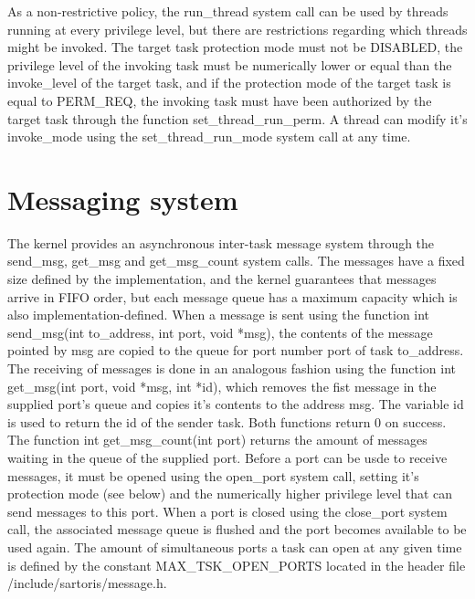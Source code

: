 \documentclass[11pt, letterpaper, twoside, english]{book}
\begin{document}
As a non-restrictive policy, the \textsf{run\_thread} system call can be used by threads running at every privilege level, but there are restrictions regarding which threads might be invoked. The target task protection mode must not be \textsf{DISABLED}, the privilege level of the invoking task must be numerically lower or equal than the \textsf{invoke\_level} of the target task, and if the protection mode of the target task is equal to \textsf{PERM\_REQ}, the invoking task must have been authorized by the target task through the function \textsf{set\_thread\_run\_perm}.
A thread can modify it's \textsf{invoke\_mode} using the \textsf{set\_thread\_run\_mode} system call at any time. 
       
\section{Messaging system}
The kernel provides an asynchronous inter-task message system through the \textsf{send\_msg}, \textsf{get\_msg} and \textsf{get\_msg\_count} system calls. The messages have a fixed size defined by the implementation, and the kernel guarantees that messages arrive in FIFO order, but each message queue has a maximum capacity which is also implementation-defined. When a message is sent using the function \textsf{int send\_msg(int to\_address, int port, void *msg)}, the contents of the message pointed by \textsf{msg} are copied to the queue for port number \textsf{port} of task \textsf{to\_address}. The receiving of messages is done in an analogous fashion using the function \textsf{int get\_msg(int port, void *msg, int *id)}, which removes the fist message in the supplied \textsf{port}'s queue and copies it's contents to the address \textsf{msg}. The variable \textsf{id} is used to return the id of the sender task. Both functions return 0 on success. 
The function \textsf{int get\_msg\_count(int port)} returns the amount of messages waiting in the queue of the supplied port.
Before a port can be usde to receive messages, it must be opened using the \textsf{open\_port} system call, setting it's protection mode (see below) and the numerically higher privilege level that can send messages to this port. When a port is closed using the \textsf{close\_port} system call, the associated message queue is flushed and the port becomes available to be used again. The amount of simultaneous ports a task can open at any given time is defined by the constant \textsf{MAX\_TSK\_OPEN\_PORTS} located in the header file \textsf{/include/sartoris/message.h}. 
\end{document}
